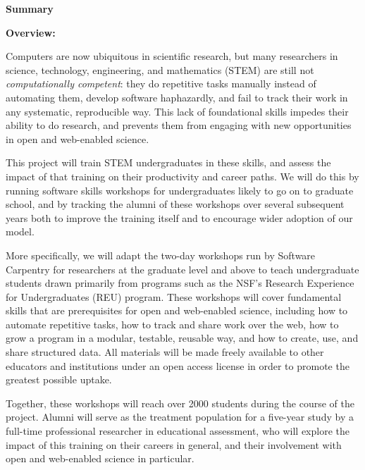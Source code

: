 \documentclass{proposalnsf}
\newlength{\up}
\begin{document}
\newpage


\begin{center}

\large\textbf{Summary}

\end{center}

\textbf{Overview:}

Computers are now ubiquitous in scientific research, but many
researchers in science, technology, engineering, and mathematics
(STEM) are still not \emph{computationally competent}: they do
repetitive tasks manually instead of automating them, develop software
haphazardly, and fail to track their work in any systematic,
reproducible way.  This lack of foundational skills impedes their
ability to do research, and prevents them from engaging with new
opportunities in open and web-enabled science.

This project will train STEM undergraduates in these skills, and
assess the impact of that training on their productivity and career
paths.  We will do this by running software skills workshops for
undergraduates likely to go on to graduate school, and by tracking
the alumni of these workshops over several subsequent years both to
improve the training itself and to encourage wider adoption of our
model.

More specifically, we will adapt the two-day workshops run by Software
Carpentry for researchers at the graduate level and above to teach
undergraduate students drawn primarily from programs such as the NSF's
Research Experience for Undergraduates (REU) program.  These workshops
will cover fundamental skills that are prerequisites for open and
web-enabled science, including how to automate repetitive tasks, how
to track and share work over the web, how to grow a program in a
modular, testable, reusable way, and how to create, use, and share
structured data.  All materials will be made freely available to other
educators and institutions under an open access license in order to
promote the greatest possible uptake.

Together, these workshops will reach over 2000 students during the
course of the project.  Alumni will serve as the treatment population
for a five-year study by a full-time professional researcher in
educational assessment, who will explore the impact of this training
on their careers in general, and their involvement with open and
web-enabled science in particular.
\end{document}
